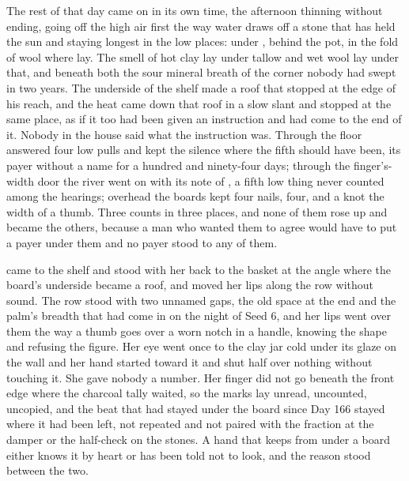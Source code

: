 The rest of that day came on in its own time, the afternoon thinning without ending, going off the high air first the way water draws off a stone that has held the sun and staying longest in the low places: under , behind the pot, in the fold of wool where  lay. The smell of hot clay lay under tallow and wet wool lay under that, and beneath both the sour mineral breath of the corner nobody had swept in two years. The underside of the shelf made a roof that stopped at the edge of his reach, and the heat came down that roof in a slow slant and stopped at the same place, as if it too had been given an instruction and had come to the end of it. Nobody in the house said what the instruction was. Through the floor  answered four low pulls and kept the silence where the fifth should have been, its payer without a name for a hundred and ninety-four days; through the finger's-width door the river went on with its note of , a fifth low thing never counted among the hearings; overhead the boards kept four nails, four, and a knot the width of a thumb. Three counts in three places, and none of them rose up and became the others, because a man who wanted them to agree would have to put a payer under them and no payer stood to any of them.

 came to the shelf and stood with her back to the basket at the angle where the board's underside became a roof, and moved her lips along the row without sound. The row stood with two unnamed gaps, the old space at the end and the palm's breadth that had come in on the night of Seed 6, and her lips went over them the way a thumb goes over a worn notch in a handle, knowing the shape and refusing the figure. Her eye went once to the clay jar cold under its glaze on the wall and her hand started toward it and shut half over nothing without touching it. She gave nobody a number. Her finger did not go beneath the front edge where the charcoal tally waited, so the marks lay unread, uncounted, uncopied, and the beat that had stayed under the board since Day 166 stayed where it had been left, not repeated and not paired with the fraction at the damper or the half-check on the stones. A hand that keeps from under a board either knows it by heart or has been told not to look, and the reason stood between the two.


